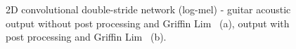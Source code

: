 \begin{figure}[htb!]
    \centering
    \captionsetup{justification=centering}
    \caption{2D convolutional double-stride network (log-mel) - guitar acoustic output without post processing and Griffin Lim ~(a), output with post processing and Griffin Lim ~(b).}
    \label{fig:apx_mel_double_gf}
\end{figure}

